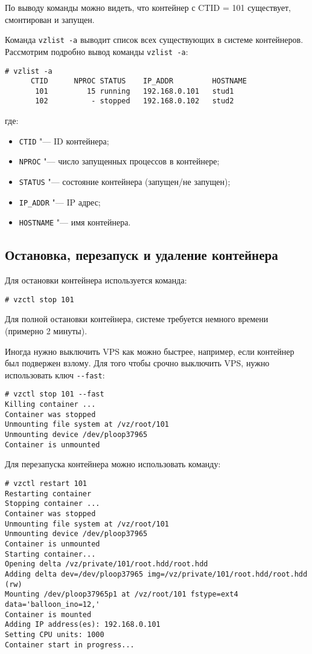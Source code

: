 По выводу команды можно видеть, что контейнер с CTID = 101 существует, смонтирован и запущен.

Команда \texttt{vzlist -a} выводит список всех существующих в системе контейнеров.
Рассмотрим подробно вывод команды \texttt{vzlist -a}:
\begin{lstlisting}
# vzlist -a
      CTID      NPROC STATUS    IP_ADDR         HOSTNAME
       101         15 running   192.168.0.101   stud1
       102          - stopped   192.168.0.102   stud2
\end{lstlisting}
где:
\begin{itemize}
    \item \texttt{CTID} "--- ID контейнера;
    \item \texttt{NPROC} "--- число запущенных процессов в контейнере;
    \item \texttt{STATUS} "--- состояние контейнера (запущен/не запущен);
    \item \texttt{IP\_ADDR} "--- IP адрес;
    \item \texttt{HOSTNAME} "--- имя контейнера.
\end{itemize}

\subsection{Остановка, перезапуск и удаление контейнера}
Для остановки контейнера используется команда:
\begin{lstlisting}
# vzctl stop 101
\end{lstlisting}

Для полной остановки контейнера, системе требуется немного времени (примерно 2 минуты).

Иногда нужно выключить VPS как можно быстрее, например, если контейнер был подвержен взлому.
Для того чтобы срочно выключить VPS, нужно использовать ключ \texttt{-{}-fast}:
\begin{lstlisting}
# vzctl stop 101 --fast
Killing container ...
Container was stopped
Unmounting file system at /vz/root/101
Unmounting device /dev/ploop37965
Container is unmounted
\end{lstlisting}

Для перезапуска контейнера можно использовать команду:
\begin{lstlisting}
# vzctl restart 101
Restarting container
Stopping container ...
Container was stopped
Unmounting file system at /vz/root/101
Unmounting device /dev/ploop37965
Container is unmounted
Starting container...
Opening delta /vz/private/101/root.hdd/root.hdd
Adding delta dev=/dev/ploop37965 img=/vz/private/101/root.hdd/root.hdd (rw)
Mounting /dev/ploop37965p1 at /vz/root/101 fstype=ext4 data='balloon_ino=12,' 
Container is mounted
Adding IP address(es): 192.168.0.101
Setting CPU units: 1000
Container start in progress...
\end{lstlisting}

